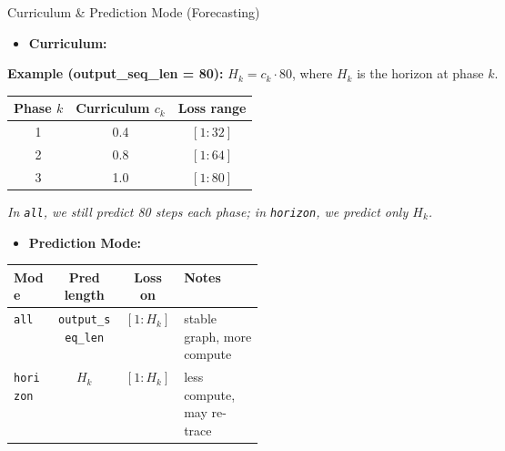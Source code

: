\begin{frame}{Curriculum \& Prediction Mode (Forecasting)}

\vspace{-1em}

\small
\begin{itemize}
  \item \textbf{Curriculum:}
\end{itemize}

\vspace{0.5em}
\footnotesize
\textbf{Example (output\_seq\_len = 80):}\quad
$H_k = c_k \cdot 80$, \quad where $H_k$ is the horizon at phase $k$.
\vspace{0.8em}

\centering
\footnotesize
\setlength{\tabcolsep}{7pt}
\renewcommand{\arraystretch}{1.15}
\begin{tabular}{c c c}
\hline
\textbf{Phase $k$} & \textbf{Curriculum $c_k$} & \textbf{Loss range} \\
\hline
1 & 0.4 & $[1:32]$ \\
2 & 0.8 & $[1:64]$ \\
3 & 1.0 & $[1:80]$ \\
\hline
\end{tabular}

\vspace{0.35em}
\scriptsize
\textit{In \texttt{all}, we still predict 80 steps each phase; in \texttt{horizon}, we predict only $H_k$.}


\vspace{1.5em}

\small
\begin{itemize}
  \item \textbf{Prediction Mode:}
\end{itemize}

\vspace{0.5em}
\centering
\small
\setlength{\tabcolsep}{7pt}
\renewcommand{\arraystretch}{1.2}
\begin{tabular}{l c c p{0.32\linewidth}}
\hline
\textbf{Mode} & \textbf{Pred length} & \textbf{Loss on} & \textbf{Notes} \\
\hline
\texttt{all} & \texttt{output\_seq\_len} & $[1:H_k]$ & stable graph, more compute \\
\texttt{horizon} & $H_k$ & $[1:H_k]$ & less compute, may re-trace \\
\hline
\end{tabular}

\end{frame}